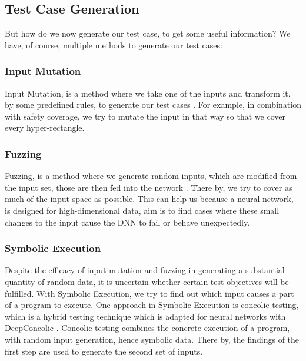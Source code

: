 \subsection*{Test Case Generation}
But how do we now generate our test case, to get some useful information?
We have, of course, multiple methods to generate our test cases:

\subsubsection{Input Mutation}
Input Mutation, is a method where we take one of the inputs and transform it, by some predefined rules, to generate our test cases .
For example, in combination with safety coverage, we try to mutate the input in that way so that we cover every hyper-rectangle.
\subsubsection{Fuzzing}
Fuzzing, is a method where we generate random inputs, which are modified from the input set, those are then fed into the network \cite{beyer_feature-guided_2018}.
There by, we try to cover as much of the input space as possible.
This can help us because a neural network, is designed for high-dimensional data, aim is to find cases where these small changes to the input cause the DNN to fail or behave unexpectedly.

\subsubsection{Symbolic Execution}
Despite the efficacy of input mutation and fuzzing in generating a substantial quantity of random data, it is uncertain whether certain test objectives will be fulfilled.
With Symbolic Execution, we try to find out which input causes a part of a program to execute.
One approach in Symbolic Execution is concolic testing, which is a hybrid testing technique which is adapted for neural networks with DeepConcolic \cite{sun_deepconcolic_2019}.
Concolic testing combines the concrete execution of a program, with random input generation, hence symbolic data.
There by, the findings of the first step are used to generate the second set of inputs.

